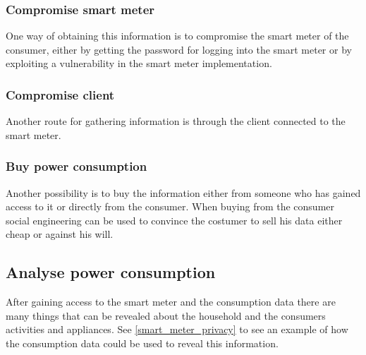 \subsubsection{Compromise smart meter}
One way of obtaining this information is to compromise the smart meter of the consumer, either by getting the password for logging into the smart meter or by exploiting a vulnerability in the smart meter implementation. 

\subsubsection{Compromise client}
Another route for gathering information is through the client connected to the smart meter.

\subsubsection{Buy power consumption}
Another possibility is to buy the information either from someone who has gained access to it or directly from the consumer.
When buying from the consumer social engineering can be used to convince the costumer to sell his data either cheap or against his will.

\subsection{Analyse power consumption}
After gaining access to the smart meter and the consumption data there are many things that can be revealed about the household and the consumers activities and appliances.
See \cref{smart_meter_privacy} to see an example of how the consumption data could be used to reveal this information.
